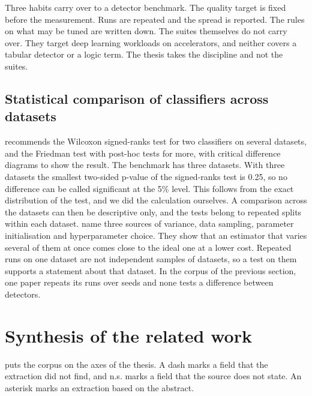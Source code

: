 Three habits carry over to a detector benchmark. The quality target is fixed
before the measurement. Runs are repeated and the spread is reported. The rules
on what may be tuned are written down. The suites themselves do not carry over.
They target deep learning workloads on accelerators, and neither covers a
tabular detector or a logic term. The thesis takes the discipline and not the
suites.

\subsection{Statistical comparison of classifiers across datasets}
\label{sec:statistical-comparison}

\citet{demsar2006statistical} recommends the Wilcoxon signed-ranks test for two
classifiers on several datasets, and the Friedman test with post-hoc tests for
more, with critical difference diagrams to show the result. The benchmark has
three datasets. With three datasets the smallest two-sided p-value of the
signed-ranks test is 0.25, so no difference can be called significant at the
5\% level. This follows from the exact distribution of the test, and we did the
calculation ourselves. A comparison across the datasets can then be descriptive
only, and the tests belong to repeated splits within each dataset.
\citet{bouthillier2021variance} name three sources of variance, data sampling,
parameter initialisation and hyperparameter choice. They show that an estimator
that varies several of them at once comes close to the ideal one at a lower
cost. Repeated runs on one dataset are not independent samples of datasets, so
a test on them supports a statement about that dataset. In the corpus of the
previous section, one paper repeats its runs over seeds and none tests a
difference between detectors.

\section{Synthesis of the related work}
\label{sec:synthesis}

 puts the corpus on the axes of the thesis. A dash marks a
field that the extraction did not find, and n.s. marks a field that the source
does not state. An asterisk marks an extraction based on the abstract.

